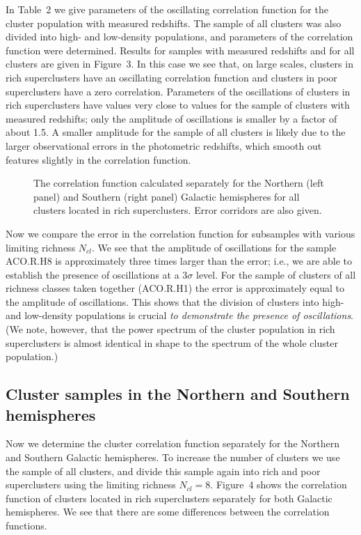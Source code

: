 In Table~2 we give parameters of the oscillating correlation function
for the cluster population with measured redshifts.  The sample of all
clusters was also divided into high- and low-density populations, and
parameters of the correlation function were determined. Results for
samples with measured redshifts and for all clusters are given in
Figure~3. In this case we see that, on large scales, clusters in
rich superclusters have an oscillating correlation function and
clusters in poor superclusters have a zero correlation.  Parameters
of the oscillations of clusters in rich superclusters have values
very close to values for the sample of clusters with measured
redshifts; only the amplitude of oscillations is smaller by a factor
of about 1.5.  A smaller amplitude for the sample of all clusters is
likely due to the larger observational errors in the photometric
redshifts, which smooth out features slightly in the correlation
function.

\begin{figure}
\epsfxsize=280pt
\vskip -17mm
\epsfysize=7cm
\caption{
The correlation function calculated separately for the Northern (left panel)
and Southern (right panel) Galactic hemispheres for all clusters 
located in rich superclusters. Error corridors are also given.}
\label{fig4}
\end{figure}


Now we compare the error in the correlation function for subsamples
with various limiting richness $N_{cl}$. We see that the amplitude of
oscillations for the sample ACO.R.H8 is approximately three times
larger than the error; i.e., we are able to establish the presence of
oscillations at a $3\sigma$ level. For the sample of clusters of all
richness classes taken together (ACO.R.H1) the error is approximately
equal to the amplitude of oscillations.  This shows that the division
of clusters into high- and low-density populations is crucial {\it to
demonstrate the presence of oscillations}. (We note, however, that the
power spectrum of the cluster population in rich superclusters is
almost identical in shape to the spectrum of the whole cluster
population.)


\subsection{ Cluster samples in the Northern and Southern hemispheres }

Now we determine the cluster correlation function separately for the
Northern and Southern Galactic hemispheres. To increase the number of
clusters we use the sample of all clusters, and divide this sample
again into rich and poor superclusters using the limiting richness
$N_{cl}=8$.  Figure~4 shows the correlation function of clusters
located in rich superclusters separately for both Galactic
hemispheres. We see that there are some differences between the
correlation functions. 

